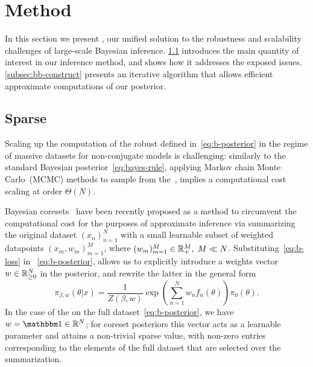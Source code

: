 \section{Method}
\label{sec:method}

In this section we present \bcores, our unified solution to the robustness and scalability challenges of large-scale Bayesian inference. \cref{subsec:sparse-b-posterior} introduces the main quantity of interest in our inference method, and shows how it addresses the exposed issues. \cref{subsec:bb-construct} presents an iterative algorithm that allows efficient approximate computations of our posterior.


\subsection{Sparse \bpost{}}
\label{subsec:sparse-b-posterior}


Scaling up the computation of the robust \bpost defined in~\cref{eq:b-posterior} in the regime of massive datasets for non-conjugate models is challenging:
similarly to the standard Bayesian posterior~\cref{eq:bayes-rule}, applying Markov chain Monte Carlo~(MCMC) methods to sample from the~\bpost{}, implies a computational cost scaling at order $\Theta(N)$. 

Bayesian coresets~\cite{huggins16,campbell19jmlr} have been recently proposed as a method to circumvent the computational cost for the purposes of approximate inference via summarizing the original dataset  $(x_n)_{n=1}^{N}$ with a small learnable subset of weighted datapoints $(x_m, w_m)_{m=1}^{M}$, where  $(w_m)_{m=1}^{M} \in \mathbb{R}^{M}_{+},\; M \ll N$. 
Substituting~\cref{eq:b-loss} in ~\cref{eq:b-posterior}, allows us to explicitly introduce a weights vector $ w \in \mathbb{R}_{\geq 0}^{N}$ in the posterior, and rewrite the latter in the general form
\[
\pi_{\beta,w}(\theta|x) 
= \frac{1}{Z(\beta, w)}  \exp\left(\sum_{n=1}^{N}w_nf_n(\theta)\right)\pi_0(\theta).
\label{eq:bcore-posterior}
\]
In the case of the \bpost{} on the full dataset~\cref{eq:b-posterior}, we have $w=\vecone \in\reals^{N}$; for coreset posteriors this vector acts as a learnable parameter and attains a non-trivial sparse value, with non-zero entries corresponding to the elements of the full dataset that are selected over the summarization.

